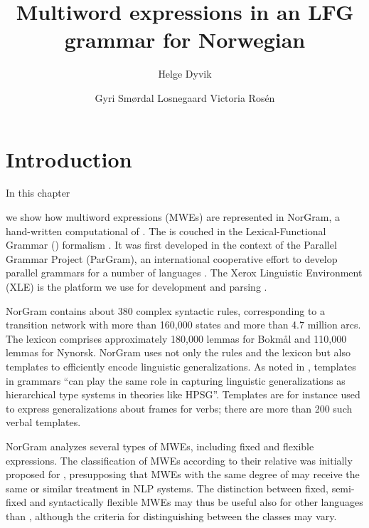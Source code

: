 \documentclass[output=paper]{langsci/langscibook}
\title{Multiword expressions in an {LFG} grammar for {N}orwegian}
\author{Helge Dyvik\affiliation{University of Bergen}
\and
Gyri Smørdal Losnegaard\affiliation{University of Bergen}
\lastand
Victoria Rosén\affiliation{University of Bergen}
}
\begin{document}
\section{Introduction}\label{dyv:sec:intro}

%
%

In this chapter\addtocounter{footnote}{1} we show how multiword expressions (MWEs) are represented in NorGram, a hand-written computational  of  \citep{dyvik00en}. 
The  is couched in the Lexical-Functional Grammar () formalism \citep{bresnanlfs,dalrymplelfg}.
It was first developed in the context of the Parallel Grammar Project (ParGram), an international cooperative effort to develop parallel  grammars for a number of languages \citep{pargram02}.
The Xerox Linguistic Environment (XLE) is the platform we use for  development and parsing \citep{maxwell93}.

NorGram contains about 380 complex syntactic rules, corresponding to a transition network with more than 160,000 states and more than 4.7 million arcs.
The lexicon comprises approximately 180,000 lemmas for  Bokmål and 110,000 lemmas for  Nynorsk.
NorGram uses not only the  rules and the lexicon but also templates to efficiently encode linguistic generalizations.
As noted in \citet[207]{dalrymple04}, templates in  grammars “can play the same role in capturing linguistic generalizations as hierarchical type systems in theories like HPSG”.
Templates are for instance used to express generalizations about  frames for verbs; there are more than 200 such verbal templates.  

NorGram analyzes several types of MWEs, including fixed and flexible expressions.
The classification of MWEs according to their relative  was initially proposed for  \citep{sag02, baldwin10}, presupposing that MWEs with the same degree of  may receive the same or similar treatment in NLP systems.
The distinction between fixed, semi-fixed and syntactically flexible MWEs may thus be useful also for other languages than , although the criteria for distinguishing between the classes may vary.
\end{document}
